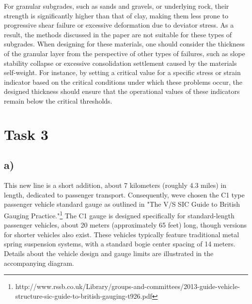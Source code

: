 \documentclass[letterpaper,12pt,leqno]{article}
\begin{document}
	For granular subgrades, such as sands and gravels, or underlying rock,
	their strength is significantly higher than that of clay, making them
	less prone to progressive shear failure or excessive deformation due to
	deviator stress. As a result, the methods discussed in the paper are not
	suitable for these types of subgrades. When designing for these
	materials, one should consider the thickness of the granular layer from
	the perspective of other types of failures, such as slope stability
	collapse or excessive consolidation settlement caused by the
	material\textquotesingle s self-weight. For instance, by setting a
	critical value for a specific stress or strain indicator based on the
	critical conditions under which these problems occur, the designed
	thickness should ensure that the operational values of these indicators
	remain below the critical thresholds.
	
	\section{Task 3}\label{task-3}
	
	\subsection{a)}\label{a-2}
	
	This new line is a short addition, about 7 kilometers (roughly 4.3
	miles) in length, dedicated to passenger transport. Consequently,
	we\textquotesingle ve chosen the C1 type passenger vehicle standard
	gauge as outlined in "The V/S SIC Guide to British Gauging Practice."\footnote{http://www.rssb.co.uk/Library/groups-and-committees/2013-guide-vehicle-structure-sic-guide-to-british-gauging-t926.pdf}
	The C1 gauge is designed specifically for standard-length passenger
	vehicles, about 20 meters (approximately 65 feet) long, though versions
	for shorter vehicles also exist. These vehicles typically feature
	traditional metal spring suspension systems, with a standard bogie
	center spacing of 14 meters. Details about the vehicle design and gauge
	limits are illustrated in the accompanying diagram.
	
\end{document}
